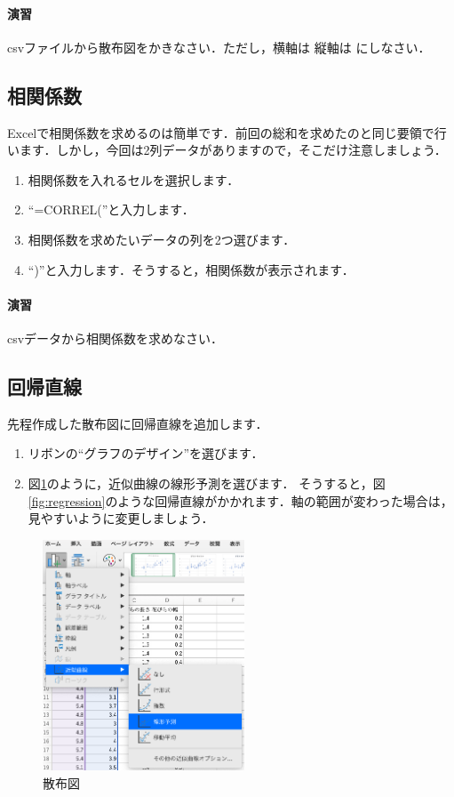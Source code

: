 \paragraph{演習}

csvファイルから散布図をかきなさい．ただし，横軸は 縦軸は にしなさい．

\subsection{相関係数}

Excelで相関係数を求めるのは簡単です．前回の総和を求めたのと同じ要領で行います．しかし，今回は2列データがありますので，そこだけ注意しましょう．

\begin{enumerate}
    \item 相関係数を入れるセルを選択します．
    \item ``=CORREL(''と入力します．
    \item 相関係数を求めたいデータの列を2つ選びます．
    \item ``)''と入力します．そうすると，相関係数が表示されます．
\end{enumerate}

\paragraph{演習}
csvデータから相関係数を求めなさい．

\subsection{回帰直線}

先程作成した散布図に回帰直線を追加します．

\begin{enumerate}
    \item リボンの``グラフのデザイン''を選びます．
    \item 図\ref{fig:regression_menu}のように，近似曲線の線形予測を選びます．
    そうすると，図\ref{fig:regression}のような回帰直線がかかれます．軸の範囲が変わった場合は，見やすいように変更しましょう．
\end{enumerate}

\begin{figure}[htbp]
    \centering
    \includegraphics[width=6cm]{chap2/regression_menu.png}
    \caption{散布図}
    \label{fig:regression_menu}
\end{figure}

